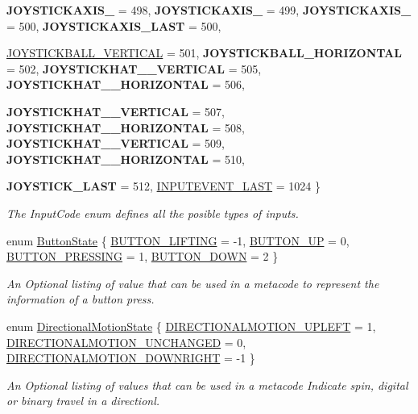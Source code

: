 \begin{DoxyCompactItemize}
{\bfseries JOYSTICKAXIS\_} =  498, 
{\bfseries JOYSTICKAXIS\_} =  499, 
{\bfseries JOYSTICKAXIS\_} =  500, 
{\bfseries JOYSTICKAXIS\_\-LAST} =  500, 
\par
\hyperlink{classphys_1_1MetaCode_a3e501cbb5bf0f6f1fdb7211465bda8d8a5ccc4a3682d65ec650534cdcec13063a}{JOYSTICKBALL\_\-VERTICAL} =  501, 
{\bfseries JOYSTICKBALL\_\-HORIZONTAL} =  502, 
{\bfseries JOYSTICKHAT\_\_\-VERTICAL} =  505, 
{\bfseries JOYSTICKHAT\_\_\-HORIZONTAL} =  506, 
\par
{\bfseries JOYSTICKHAT\_\_\-VERTICAL} =  507, 
{\bfseries JOYSTICKHAT\_\_\-HORIZONTAL} =  508, 
{\bfseries JOYSTICKHAT\_\_\-VERTICAL} =  509, 
{\bfseries JOYSTICKHAT\_\_\-HORIZONTAL} =  510, 
\par
{\bfseries JOYSTICK\_\-LAST} =  512, 
\hyperlink{classphys_1_1MetaCode_a3e501cbb5bf0f6f1fdb7211465bda8d8adc78bfd04a85c4bbe39718f9acacbbe3}{INPUTEVENT\_\-LAST} =  1024
 \}
\begin{DoxyCompactList}\small\item\em The InputCode enum defines all the posible types of inputs. \item\end{DoxyCompactList}\item 
enum \hyperlink{classphys_1_1MetaCode_a2fdfb26b3e50ceb0ccc60bfc4c3d6ac2}{ButtonState} \{ \hyperlink{classphys_1_1MetaCode_a2fdfb26b3e50ceb0ccc60bfc4c3d6ac2a6b5564408703517f36debd8c423e2dee}{BUTTON\_\-LIFTING} =  -\/1, 
\hyperlink{classphys_1_1MetaCode_a2fdfb26b3e50ceb0ccc60bfc4c3d6ac2ae275c52779b0f6ec37533af256a70cc3}{BUTTON\_\-UP} =  0, 
\hyperlink{classphys_1_1MetaCode_a2fdfb26b3e50ceb0ccc60bfc4c3d6ac2a33669b2b9ca814664296da55702e412d}{BUTTON\_\-PRESSING} =  1, 
\hyperlink{classphys_1_1MetaCode_a2fdfb26b3e50ceb0ccc60bfc4c3d6ac2a5b52ee1db94dbc2db23f3b4c267b5438}{BUTTON\_\-DOWN} =  2
 \}
\begin{DoxyCompactList}\small\item\em An Optional listing of value that can be used in a metacode to represent the information of a button press. \item\end{DoxyCompactList}\item 
enum \hyperlink{classphys_1_1MetaCode_ad6ed6266b5f4219a6f5da29ebe018757}{DirectionalMotionState} \{ \hyperlink{classphys_1_1MetaCode_ad6ed6266b5f4219a6f5da29ebe018757ae4b09c3b8e79b189d9fbc2ea8a1bcade}{DIRECTIONALMOTION\_\-UPLEFT} =  1, 
\hyperlink{classphys_1_1MetaCode_ad6ed6266b5f4219a6f5da29ebe018757a01bfdb29aaa2cb816b704667d5cc348f}{DIRECTIONALMOTION\_\-UNCHANGED} =  0, 
\hyperlink{classphys_1_1MetaCode_ad6ed6266b5f4219a6f5da29ebe018757af4a101f9bcd1baedca43bacd3845eb41}{DIRECTIONALMOTION\_\-DOWNRIGHT} =  -\/1
 \}
\begin{DoxyCompactList}\small\item\em An Optional listing of values that can be used in a metacode Indicate spin, digital or binary travel in a directionl. \item\end{DoxyCompactList}\end{DoxyCompactItemize}
